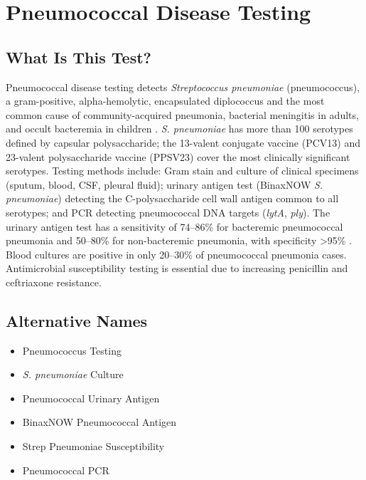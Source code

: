 \chapter{Pneumococcal Disease Testing}

\section*{What Is This Test?}
Pneumococcal disease testing detects \textit{Streptococcus pneumoniae} (pneumococcus), a gram-positive, alpha-hemolytic, encapsulated diplococcus and the most common cause of community-acquired pneumonia, bacterial meningitis in adults, and occult bacteremia in children \cite{vanderpoll2009pathogenesis}. \textit{S. pneumoniae} has more than 100 serotypes defined by capsular polysaccharide; the 13-valent conjugate vaccine (PCV13) and 23-valent polysaccharide vaccine (PPSV23) cover the most clinically significant serotypes. Testing methods include: Gram stain and culture of clinical specimens (sputum, blood, CSF, pleural fluid); urinary antigen test (BinaxNOW \textit{S. pneumoniae}) detecting the C-polysaccharide cell wall antigen common to all serotypes; and PCR detecting pneumococcal DNA targets (\textit{lytA}, \textit{ply}). The urinary antigen test has a sensitivity of 74--86\% for bacteremic pneumococcal pneumonia and 50--80\% for non-bacteremic pneumonia, with specificity >95\% \cite{sinclair2013systematic}. Blood cultures are positive in only 20--30\% of pneumococcal pneumonia cases. Antimicrobial susceptibility testing is essential due to increasing penicillin and ceftriaxone resistance.

\section*{Alternative Names}
\begin{itemize}
  \item Pneumococcus Testing
  \item \textit{S. pneumoniae} Culture
  \item Pneumococcal Urinary Antigen
  \item BinaxNOW Pneumococcal Antigen
  \item Strep Pneumoniae Susceptibility
  \item Pneumococcal PCR
\end{itemize}
